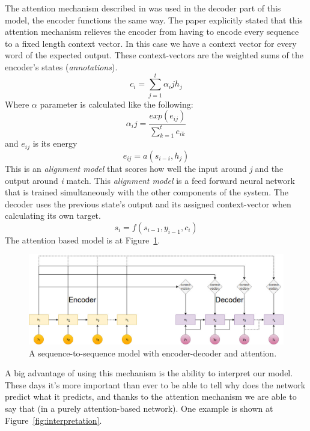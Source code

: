 The attention mechanism described in \cite{Bahdanau:2015} was used in the decoder part of this model, the encoder functions the same way. The paper explicitly stated that this attention mechanism relieves the encoder from having to encode every sequence to a fixed length context vector. In this case we have a context vector for every word of the expected output. These context-vectors are the weighted sums of the encoder's states (\textit{annotations}).
\[c_i = \sum_{j=1}^{t} \alpha_ij h_j\]
Where \(\alpha\) parameter is calculated like the following:
\[\alpha_ij = \frac{exp(e_{ij})}{\sum_{k=1}^{t} e_{ik}} \]
and \(e_{ij}\) is its energy
\[e_{ij} = a(s_{i-i}, h_j)\]
This is an \textit{alignment model} that scores how well the input around \textit{j} and the output around \textit{i} match. This \textit{alignment model} is a feed forward neural network that is trained simultaneously with the other components of the system.
The decoder uses the previous state's output and its assigned context-vector when calculating its own target.
\[s_i = f(s_{i-1}, y_{i-1}, c_i)\]
The attention based model is at Figure~\ref{fig:attention}.
\begin{figure}[!htb]
	\centering
	\includegraphics[scale=0.4]{figures/attention.jpg}
	\caption{A sequence-to-sequence model with encoder-decoder and attention.}
	\label{fig:attention}
\end{figure}

A big advantage of using this mechanism is the ability to interpret our model. These days it's more important than ever to be able to tell why does the network predict what it predicts, and thanks to the attention mechanism we are able to say that (in a purely attention-based network). One example is shown at Figure~\ref{fig:interpretation}.

